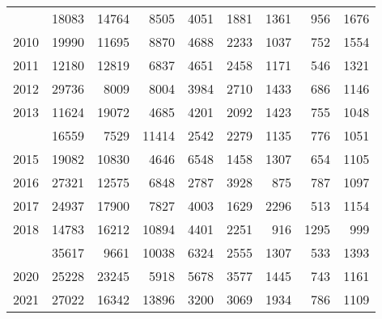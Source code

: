 \documentclass[
]{article}
\begin{document}
\begin{longtable}[t]{lrrrrrrrr}
\addlinespace
2009 & 18083 & 14764 & 8505 & 4051 & 1881 & 1361 & 956 & 1676\\
2010 & 19990 & 11695 & 8870 & 4688 & 2233 & 1037 & 752 & 1554\\
2011 & 12180 & 12819 & 6837 & 4651 & 2458 & 1171 & 546 & 1321\\
2012 & 29736 & 8009 & 8004 & 3984 & 2710 & 1433 & 686 & 1146\\
2013 & 11624 & 19072 & 4685 & 4201 & 2092 & 1423 & 755 & 1048\\
\addlinespace
2014 & 16559 & 7529 & 11414 & 2542 & 2279 & 1135 & 776 & 1051\\
2015 & 19082 & 10830 & 4646 & 6548 & 1458 & 1307 & 654 & 1105\\
2016 & 27321 & 12575 & 6848 & 2787 & 3928 & 875 & 787 & 1097\\
2017 & 24937 & 17900 & 7827 & 4003 & 1629 & 2296 & 513 & 1154\\
2018 & 14783 & 16212 & 10894 & 4401 & 2251 & 916 & 1295 & 999\\
\addlinespace
2019 & 35617 & 9661 & 10038 & 6324 & 2555 & 1307 & 533 & 1393\\
2020 & 25228 & 23245 & 5918 & 5678 & 3577 & 1445 & 743 & 1161\\
2021 & 27022 & 16342 & 13896 & 3200 & 3069 & 1934 & 786 & 1109\\*
\end{longtable}
\end{document}
